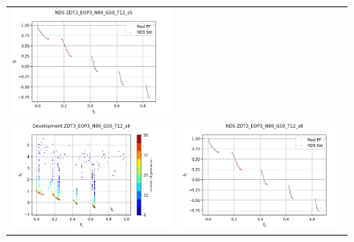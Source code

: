\begin{figure}[H]
\begin{tabular}{c c}
    \includegraphics[scale=0.5]{figures/ZDT3_EOP3_N80_G50_T12/s5_nds.png}\\
    \includegraphics[scale=0.5]{figures/ZDT3_EOP3_N80_G50_T12/s8_dev.png} &
    \includegraphics[scale=0.5]{figures/ZDT3_EOP3_N80_G50_T12/s8_nds.png}\\

\end{tabular}
\end{figure}
